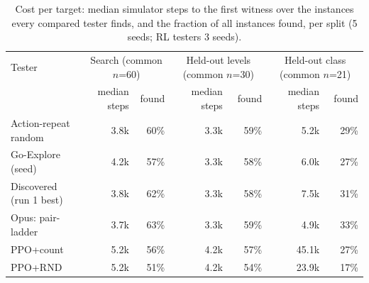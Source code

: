 \begin{table}[t]\centering\footnotesize
\begin{tabular}{lrrrrrr}
\toprule
Tester & \multicolumn{2}{c}{Search (common $n$=60)} & \multicolumn{2}{c}{Held-out levels (common $n$=30)} & \multicolumn{2}{c}{Held-out class (common $n$=21)} \\
 & median steps & found & median steps & found & median steps & found \\
\midrule
Action-repeat random & 3.8k & 60\% & 3.3k & 59\% & 5.2k & 29\% \\
Go-Explore (seed) & 4.2k & 57\% & 3.3k & 58\% & 6.0k & 27\% \\
Discovered (run 1 best) & 3.8k & 62\% & 3.3k & 58\% & 7.5k & 31\% \\
Opus: pair-ladder & 3.7k & 63\% & 3.3k & 59\% & 4.9k & 33\% \\
PPO+count & 5.2k & 56\% & 4.2k & 57\% & 45.1k & 27\% \\
PPO+RND & 5.2k & 51\% & 4.2k & 54\% & 23.9k & 17\% \\
\bottomrule
\end{tabular}
\caption{Cost per target: median simulator steps to the first witness over the instances every compared tester finds, and the fraction of all instances found, per split (5 seeds; RL testers 3 seeds).}
\label{tab:cost}
\end{table}
